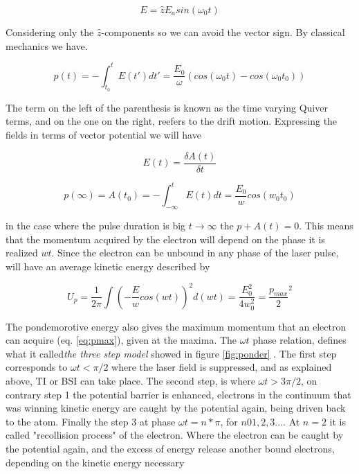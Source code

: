 \begin{equation}
E=\widehat{z}E_{a}sin(\omega_{0} t) 
\end{equation}

Considering only the $\widehat{z}$-components so we can avoid the vector sign. By classical mechanics we have.

\begin{equation}
p(t)=-\int_{t_{0}}^{t} E(t\prime)dt\prime = \dfrac{E_{0}}{\omega} (cos(\omega_{0} t)- cos(\omega_{0} t_{0}))
\end{equation}

The term on the left of the parenthesis is known as the time varying Quiver terms, and on the one on the right, reefers to the drift motion. 
Expressing the fields in terms of vector potential we will have

\begin{equation}
E(t) = \dfrac{\delta A(t)}{\delta t}
\end{equation}

\begin{equation}
p(\infty) = A(t_{0}) = -\int_{-\infty}^{t} E(t) dt = \dfrac{E_{0}}{w} cos(w_{0}t_{0})
\label{eq:pmax}
\end{equation}

in the case where the pulse  duration is big $t \longrightarrow \infty$ the $p + A(t) = 0$. This means that the momentum acquired by the electron will depend on the phase it is realized $wt$. Since the electron can be unbound in any phase of the laser pulse, will have an average kinetic energy described by

\begin{equation} 
U_{p} = \dfrac{1}{2\pi} \int (-\dfrac{E}{w} cos (wt))^{2}d(wt) = \dfrac{E^{2}_{0}}{4w^{2}_{0}} = \dfrac{p_{max}}{2}^{2}
\label{eq:pondeenergy}
\end{equation}

The pondemorotive energy also gives the maximum momentum that an electron can acquire (eq. \ref{eq:pmax}), given at the maxima. The $\omega t$ phase relation, defines what it called\textit{the three step model} showed in figure \ref{fig:ponder} . The first step corresponds to $\omega t < \pi /2$ where the laser field is suppressed, and as explained above, TI or BSI can take place. The second step, is where $\omega t > 3\pi /2$, on contrary step 1 the potential barrier is enhanced, electrons in the continuum that was winning kinetic energy are caught by the potential again, being driven  back to the atom. Finally the step 3 at  phase  $\omega t = n* \pi$, for $n 0 1,2,3...$. At $n=2$ it is called "recollision process" of the electron. Where the electron can be caught by the potential again, and the excess of energy release another bound electrons, depending on the kinetic energy necessary \cite{krishnan_ignition_2012}

